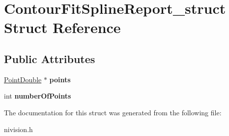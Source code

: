 \hypertarget{structContourFitSplineReport__struct}{
\section{ContourFitSplineReport\_\-struct Struct Reference}
\label{structContourFitSplineReport__struct}
}
\subsection*{Public Attributes}
\begin{DoxyCompactItemize}
\item 
\hypertarget{structContourFitSplineReport__struct_a04ea220f362679b20077676d4ab1ed78}{
\hyperlink{structPointDouble__struct}{PointDouble} $\ast$ {\bfseries points}}
\label{structContourFitSplineReport__struct_a04ea220f362679b20077676d4ab1ed78}

\item 
\hypertarget{structContourFitSplineReport__struct_a114c493a0138bb574671e461941f3c45}{
int {\bfseries numberOfPoints}}
\label{structContourFitSplineReport__struct_a114c493a0138bb574671e461941f3c45}

\end{DoxyCompactItemize}


The documentation for this struct was generated from the following file:\begin{DoxyCompactItemize}
\item 
nivision.h\end{DoxyCompactItemize}
